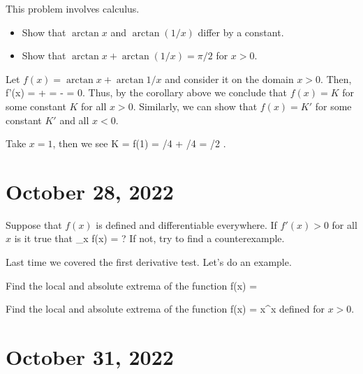 \documentclass[11pt]{amsart}
\begin{document}
\newpage

\begin{eg} 
This problem involves calculus. 
\begin{itemize}
\item Show that $\arctan x$ and $\arctan (1/x)$ differ by a constant. 
\item Show that $\arctan x + \arctan(1/x) = \pi/2$ for $x > 0$. 
\end{itemize} 
\end{eg} 

\newpage 

Let $f(x) = \arctan x + \arctan 1/x$ and consider it on the domain $x > 0$. 
Then, 
\beqn
f'(x) =  +  =  -  = 0.
\eeqn
Thus, by the corollary above we conclude that $f(x) = K$ for some constant $K$ for all $x > 0$. 
Similarly, we can show that $f(x) = K'$ for some constant $K'$ and all $x < 0$. 

Take $x = 1$, then we see
\beqn
K = f(1) = \pi/4 + \pi/4 = \pi/2 .
\eeqn 

\newpage

\section*{October 28, 2022} 

\begin{eg} 
Suppose that $f(x)$ is defined and differentiable everywhere. 
If $f'(x) > 0$ for all $x$ is it true that 
\beqn
\lim_{x \to \infty} f(x) = \infty ?
\eeqn
If not, try to find a counterexample. 
\end{eg} 

\vspace{5cm} 

Last time we covered the first derivative test.
Let's do an example. 
\begin{eg} 
Find the local and absolute extrema of the function 
\beqn
f(x) =  
\eeqn
\end{eg} 

\newpage 

\begin{eg} 
Find the local and absolute extrema of the function
\beqn
f(x) = x^x
\eeqn 
defined for $x > 0$. 
\end{eg} 
\vspace{5cm} 

\newpage

\section*{October 31, 2022}
\end{document}
